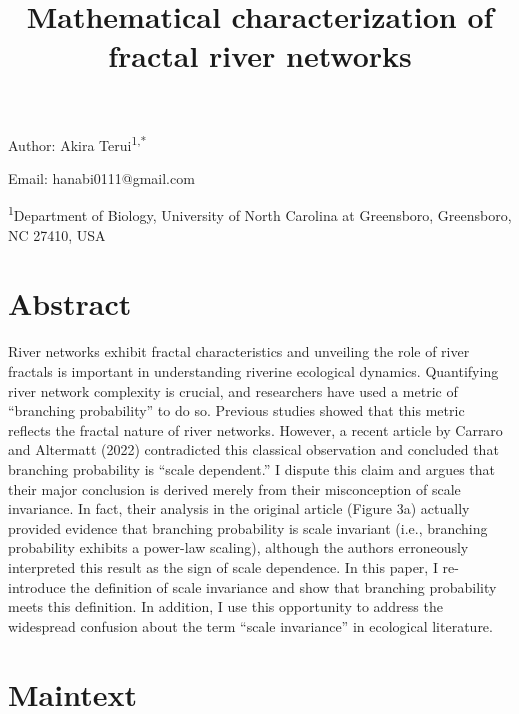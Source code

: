 \documentclass[
  12pt,
]{article}
\title{Mathematical characterization of fractal river networks}
\author{}
\date{\vspace{-2.5em}}
\begin{document}
\maketitle

Author: Akira Terui\textsuperscript{1,*}

Email: hanabi0111@gmail.com

\textsuperscript{1}Department of Biology, University of North Carolina at Greensboro, Greensboro, NC 27410, USA

\hypertarget{abstract}{%
\section{Abstract}\label{abstract}}

River networks exhibit fractal characteristics and unveiling the role of river fractals is important in understanding riverine ecological dynamics. Quantifying river network complexity is crucial, and researchers have used a metric of ``branching probability'' to do so. Previous studies showed that this metric reflects the fractal nature of river networks. However, a recent article by Carraro and Altermatt (2022) contradicted this classical observation and concluded that branching probability is ``scale dependent.'' I dispute this claim and argues that their major conclusion is derived merely from their misconception of scale invariance. In fact, their analysis in the original article (Figure 3a) actually provided evidence that branching probability is scale invariant (i.e., branching probability exhibits a power-law scaling), although the authors erroneously interpreted this result as the sign of scale dependence. In this paper, I re-introduce the definition of scale invariance and show that branching probability meets this definition. In addition, I use this opportunity to address the widespread confusion about the term ``scale invariance'' in ecological literature.

\hypertarget{maintext}{%
\section{Maintext}\label{maintext}}
\end{document}
